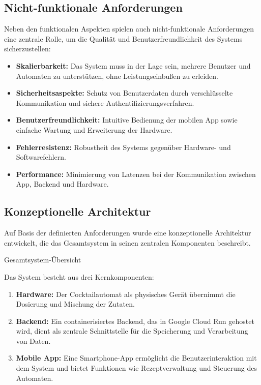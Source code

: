 \subsection{Nicht-funktionale Anforderungen}

Neben den funktionalen Aspekten spielen auch nicht-funktionale Anforderungen eine zentrale Rolle, um die Qualität und Benutzerfreundlichkeit des Systems sicherzustellen:

\begin{itemize}
	  \item	\textbf{\textcolor{red7}{Skalierbarkeit:}} Das System muss in der Lage sein, mehrere Benutzer und Automaten zu unterstützen, ohne Leistungseinbußen zu erleiden.
	  \item	\textbf{\textcolor{red7}{Sicherheitsaspekte:}} Schutz von Benutzerdaten durch verschlüsselte Kommunikation und sichere Authentifizierungsverfahren.
	  \item	\textbf{\textcolor{red7}{Benutzerfreundlichkeit:}} Intuitive Bedienung der mobilen App sowie einfache Wartung und Erweiterung der Hardware.
	  \item	\textbf{\textcolor{red7}{Fehlerresistenz:}} Robustheit des Systems gegenüber Hardware- und Softwarefehlern.
	  \item	\textbf{\textcolor{red7}{Performance:}} Minimierung von Latenzen bei der Kommunikation zwischen App, Backend und Hardware.
\end{itemize}

\subsection{Konzeptionelle Architektur}

Auf Basis der definierten Anforderungen wurde eine konzeptionelle Architektur entwickelt, die das Gesamtsystem in seinen zentralen Komponenten beschreibt.

Gesamtsystem-Übersicht

Das System besteht aus drei Kernkomponenten:

\begin{enumerate}
  \item \textbf{\textcolor{red7}{Hardware:}} Der Cocktailautomat als physisches Gerät übernimmt die Dosierung und Mischung der Zutaten.
  \item \textbf{\textcolor{red7}{Backend:}} Ein containerisiertes Backend, das in Google Cloud Run gehostet wird, dient als zentrale Schnittstelle für die Speicherung und Verarbeitung von Daten.
  \item \textbf{\textcolor{red7}{Mobile App:}} Eine Smartphone-App ermöglicht die Benutzerinteraktion mit dem System und bietet Funktionen wie Rezeptverwaltung und Steuerung des Automaten.
\end{enumerate}

